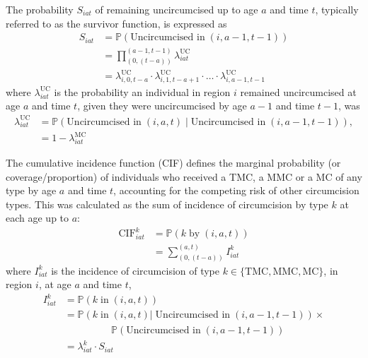 \documentclass{article}
\begin{document}
\begin{appendix}

The probability $S_{iat}$ of remaining uncircumcised up to age $a$ and time $t$,  typically referred to as the survivor function, is expressed as
\begin{equation}
	\begin{split}
		S_{iat} &= \mathbb{P}(\text{Uncircumcised in} \; (i,a-1,t-1)) \\
				&= \prod_{(0,(t-a))}^{(a-1,t-1)}\lambda^{\text{UC}}_{iat} \\
				&= \lambda^{\text{UC}}_{i,0,t-a}\cdot \lambda^{\text{UC}}_{i,1,t-a+1}\cdot\ldots \cdot\lambda^{\text{UC}}_{i,a-1,t-1}
	\end{split}
	\label{eqn::survfunc}
\end{equation}
where $\lambda^{\text{UC}}_{iat}$ is the probability an individual in region $i$ remained uncircumcised at age $a$ and time $t$, given they were uncircumcised by age $a-1$ and time $t-1$, was
\begin{equation*}
	\begin{split}
		\lambda^{\text{UC}}_{iat} &= \mathbb{P}(\text{Uncircumcised in}  \; (i,a,t) \; | \; \text{Uncircumcised in} \; (i,a-1, t-1)),\\
		&= 1 - \lambda^{\text{MC}}_{iat} 
	\end{split}
	\label{eqn::uncirc}
\end{equation*}

The cumulative incidence function (CIF) defines the marginal probability (or coverage/proportion) of individuals who received a TMC, a MMC or a MC of any type by age $a$ and time $t$, accounting for the competing risk of other circumcision types. This was calculated as the sum of incidence of circumcision by type $k$ at each age up to $a$:
\begin{equation*}
	\begin{split}
		\text{CIF}_{iat}^k &= \mathbb{P}(k \; \text{by} \; (i,a,t)) \\
		&= \sum_{(0,(t-a))}^{(a,t)} I^k_{iat}
	\end{split}
	\label{eqn::cuminc}
\end{equation*}
where $I^k_{iat}$ is the incidence of circumcision of type $k\in \{\textrm{TMC}, \textrm{MMC}, \textrm{MC}\}$, in region $i$, at age $a$ and time $t$, 
\begin{equation*}
	\begin{split}
		I_{iat}^k &= \mathbb{P}(k \; \text{in} \; (i,a,t)) \\
		       &= \mathbb{P}(k \; \text{in} \; (i,a,t) | \; \text{Uncircumcised in} \; (i,a-1,t-1))\times \\
		       & \;\;\;\;\;\;\;\;\;\;\;\;\;\;\;\;\;\mathbb{P}(\text{Uncircumcised in} \; (i,a-1,t-1)) \\
	    	   &= \lambda_{iat}^k \cdot S_{iat} 
	\end{split}
	\label{eqn::inc}
\end{equation*}


\end{appendix}
\end{document}
